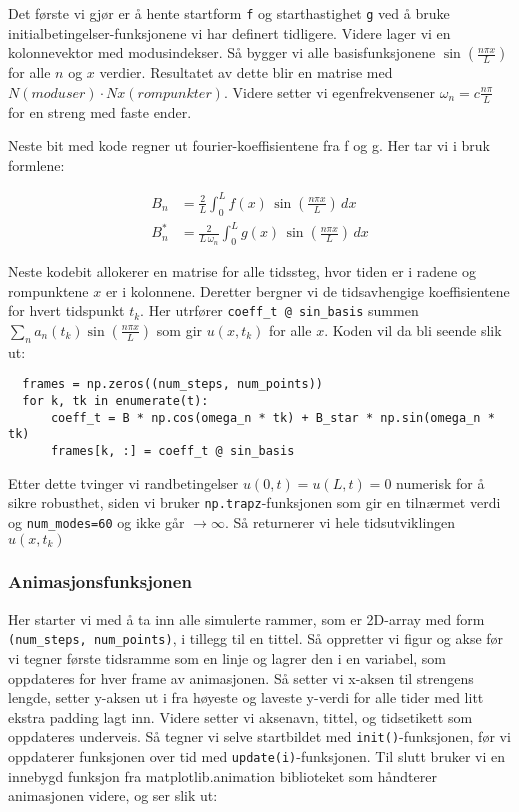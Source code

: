 Det første vi gjør er å hente startform \verb|f| og starthastighet \verb|g| ved å bruke initialbetingelser-funksjonene vi har definert tidligere. Videre lager vi en kolonnevektor med
modusindekser. Så bygger vi alle basisfunksjonene $\sin(\frac{n \pi x}{L})$ for alle $n$ og $x$ verdier. Resultatet av dette blir en matrise med $N (moduser) \cdot Nx (rompunkter)$. Videre
setter vi egenfrekvensener $\omega_n = c \frac{n \pi}{L}$ for en streng med faste ender.

Neste bit med kode regner ut fourier-koeffisientene fra f og g. Her tar vi i bruk formlene:

\begin{align*}
  B_n &= \frac{2}{L} \int_{0}^{L} f(x)\,\sin\!\left(\frac{n\pi x}{L}\right)\,dx \\
  B_n^{*} &= \frac{2}{L\,\omega_n} \int_{0}^{L} g(x)\,\sin\!\left(\frac{n\pi x}{L}\right)\,dx
\end{align*}

Neste kodebit allokerer en matrise for alle tidssteg, hvor tiden er i radene og rompunktene $x$ er i kolonnene. Deretter bergner vi de tidsavhengige koeffisientene for hvert tidspunkt $t_k$.
Her utrfører \verb|coeff_t @ sin_basis| summen $\sum_n a_n(t_k) \sin(\frac{n \pi x}{L})$ som gir $u(x, t_k)$ for alle $x$. Koden vil da bli seende slik ut:

\begin{lstlisting}
  frames = np.zeros((num_steps, num_points))
  for k, tk in enumerate(t):
      coeff_t = B * np.cos(omega_n * tk) + B_star * np.sin(omega_n * tk)
      frames[k, :] = coeff_t @ sin_basis
\end{lstlisting}

Etter dette tvinger vi randbetingelser $u(0, t) = u(L, t) = 0$ numerisk for å sikre robusthet, siden vi bruker \verb|np.trapz|-funksjonen som gir en tilnærmet verdi og \verb|num_modes=60| og
ikke går $\rightarrow \infty$. Så returnerer vi hele tidsutviklingen $u(x, t_k)$

\subsubsection{Animasjonsfunksjonen}
Her starter vi med å ta inn alle simulerte rammer, som er 2D-array med form \\ 
\verb|(num_steps, num_points)|, i tillegg til en tittel. Så oppretter vi figur og akse
før vi tegner første tidsramme som en linje og lagrer den i en variabel, som oppdateres for hver frame av animasjonen. Så setter vi x-aksen til strengens lengde, setter 
y-aksen ut i fra høyeste og laveste y-verdi for alle tider med litt ekstra padding lagt inn. Videre setter vi aksenavn, tittel, og tidsetikett som oppdateres underveis.
Så tegner vi selve startbildet med \verb|init()|-funksjonen, før vi oppdaterer funksjonen over tid med \verb|update(i)|-funksjonen. Til slutt bruker vi en innebygd funksjon
fra matplotlib.animation biblioteket som håndterer animasjonen videre, og ser slik ut:


